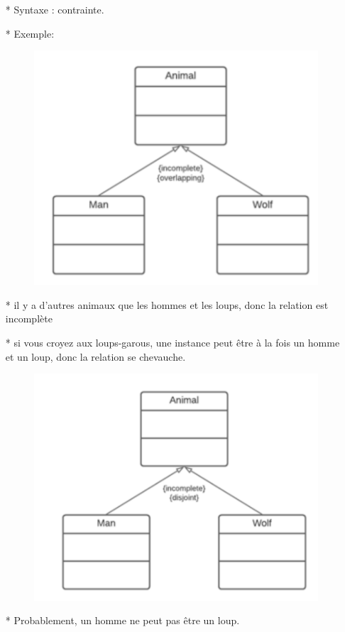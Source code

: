 \documentclass[12pt]{article}
\begin{document}
\begin{itemize}
\begin{itemize}
		\end{itemize}
	\item[* ] Syntaxe : {contrainte}.
	\newpage
	\item[* ] Exemple:
		\begin{figure}[!hbtp]
		\centering
		\includegraphics[scale=0.75]{Capture4.PNG}
	\end{figure}
	\item[* ] il y a d'autres animaux que les hommes
	et les loups, donc la relation est
	incomplète
	\item[* ] si vous croyez aux loups-garous, une
	instance peut être à la fois un homme et un
	loup, donc la relation se chevauche.
	\begin{figure}[!hbtp]
		\centering
		\includegraphics[scale=0.75]{Capture5.PNG}
	\end{figure}
	\item[*] Probablement, un homme ne peut pas être un loup.
	\end{itemize}
\end{document}

